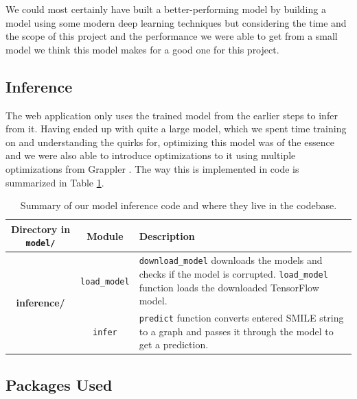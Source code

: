 \documentclass[fontsize=11pt]{article}
\begin{document}
We could most certainly have built a better-performing model by building a model using some modern deep learning techniques but considering the time and the scope of this project and the performance we were able to get from a small model we think this model makes for a good one for this project.

\subsection*{Inference}

The web application only uses the trained model from the earlier steps to infer from it. Having ended up with quite a large model, which we spent time training on and understanding the quirks for, optimizing this model was of the essence and we were also able to introduce optimizations to it using multiple optimizations from Grappler \citep{48051}. The way this is implemented in code is summarized in Table \ref{tab:infer}.

\begin{table}[ht]
\centering
\caption{Summary of our model inference code and where they live in the codebase.}
\label{tab:infer}
\begin{tabularx}{\textwidth}{ccX}
\toprule
\textbf{Directory in \texttt{model/}} & \textbf{Module} & \textbf{Description}\\
\midrule
\multirow{2}{*}{\textbf{inference/}} & \texttt{load\_model} &\texttt{download\_model} downloads the models and checks if the model is corrupted. \texttt{load\_model} function loads the downloaded TensorFlow model.\\
\midrule
\multirow{2}{*}{\textbf{inference/}} & \texttt{infer} &\texttt{predict} function converts entered SMILE string to a graph and passes it through the model to get a prediction.\\
\bottomrule
\end{tabularx}
\end{table}

\subsection*{Packages Used}
\end{document}
